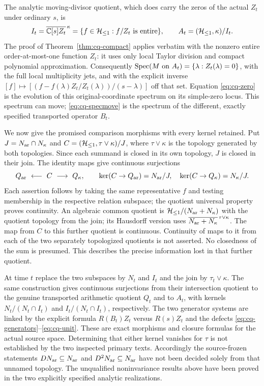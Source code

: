 The analytic moving-divisor quotient, which does carry the zeros of
the actual $Z_t$ under ordinary $s$, is
\begin{equation}\label{eq:cq-divisor}
 I_t=\overline{\mathbb C[s]Z_t}^{\,\kappa}
 =\{f\in\mathcal H_{\leq 1}:f/Z_t\text{ is entire}\},\qquad
 A_t=(\mathcal H_{\leq 1},\kappa)/I_t.
\end{equation}
The proof of Theorem~\ref{thm:cq-compact} applies verbatim with
the nonzero entire order-at-most-one function $Z_t$: it uses only
local Taylor division and compact polynomial approximation.
Consequently $\operatorname{Spec}(M\text{ on }A_t)=\{\lambda:Z_t(\lambda)=0\}$,
with the full local multiplicity jets, and with the explicit inverse
$[f]\mapsto[(f-f(\lambda)Z_t/Z_t(\lambda))/(s-\lambda)]$
off that set. Equation \eqref{eq:cq-zero} is the evolution of this
original-coordinate spectrum on its simple-zero locus.
This spectrum can move; \eqref{eq:cq-specmove} is the spectrum
of the different, exactly specified transported operator $B_t$.

We now give the promised comparison morphisms with every kernel
retained. Put $J=N_{\rm ar}\cap N_\kappa$ and
$C=(\mathcal H_{\leq 1},\tau\vee\kappa)/J$, where $\tau\vee\kappa$ is the
topology generated by both topologies. Since each summand is closed
in its own topology, $J$ is closed in their join. The identity maps
give continuous surjections
\begin{equation}\label{eq:cq-span}
 Q_{\rm ar}\ \longleftarrow\ C\ \longrightarrow\ Q_\kappa,
 \qquad\ker(C\to Q_{\rm ar})=N_{\rm ar}/J,
 \quad\ker(C\to Q_\kappa)=N_\kappa/J.
\end{equation}
Each assertion follows by taking the same representative $f$ and
testing membership in the respective relation subspace; the quotient
universal property proves continuity. An algebraic common quotient is
$\mathcal H_{\leq 1}/(N_{\rm ar}+N_\kappa)$ with the quotient topology from the join;
its Hausdorff version uses
$\overline{N_{\rm ar}+N_\kappa}^{\,\tau\vee\kappa}$.
The map from $C$ to this further quotient is continuous. Continuity
of maps to it from each of the two separately topologized quotients
is not asserted. No closedness of the sum is presumed. This describes
the precise information lost in that further quotient.

At time $t$ replace the two subspaces by $N_t$ and $I_t$ and the
join by $\tau_t\vee\kappa$. The same construction gives continuous
surjections from their intersection quotient to the genuine transported
arithmetic quotient $Q_t$ and to $A_t$, with kernels
$N_t/(N_t\cap I_t)$ and $I_t/(N_t\cap I_t)$, respectively.
The two generator systems are linked by the explicit formula
$R(B_t)Z_t$ versus $R(s)Z_t$ and the defects
\eqref{eq:cq-generators}--\eqref{eq:cq-unit}.
These are exact morphisms and closure formulas for the actual source
space. Determining that either kernel vanishes for $\tau$ is not
established by the two inspected primary texts. Accordingly the
source-frozen statements $DN_{\rm ar}\subseteq N_{\rm ar}$ and
$D^2N_{\rm ar}\subseteq N_{\rm ar}$ have not been decided solely from that
unnamed topology. The unqualified noninvariance results above have
been proved in the two explicitly specified analytic realizations.

